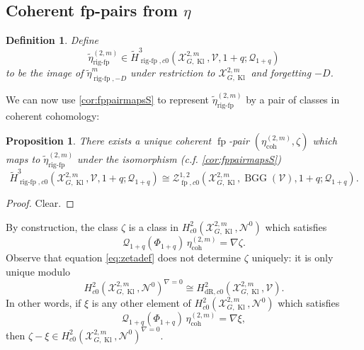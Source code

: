 \documentclass[cjm]{ipart}
\theoremstyle{plain}
\newtheorem{proposition}[theorem]{Proposition}
\newtheorem{definition}[theorem]{Definition}
\theoremstyle{remark}
\DeclareMathOperator{\BGG}{BGG}
\DeclareMathOperator{\coh}{coh}
\DeclareMathOperator{\fp}{fp}
\DeclareMathOperator{\Kl}{Kl}
\DeclareMathOperator{\rigfp}{rig-fp}
\newcommand{\Pif}{\Pi_{\mathrm{f}}}
\newcommand{\cN}{\mathcal{N}}
\newcommand{\cQ}{\mathcal{Q}}
\newcommand{\cV}{\mathcal{V}}
\newcommand{\cX}{\mathcal{X}}
\newcommand{\dR}{\mathrm{dR}}
\newcommand{\wH}{\widetilde{H}}
\numberwithin{equation}{subsection}
\begin{document}


 \subsection{Coherent fp-pairs from $\eta$}\label{ssec:coherentfppaireta}



  \begin{definition}\label{def:etaord}
   Define
  \[
   \tilde{\eta}_{\rigfp}^{(2,m)} \in \wH^3_{\rigfp, c0}(\cX_{G,\Kl}^{2,m}, \cV, 1+q; \cQ_{1+q})
  \]
  to be the image of $\tilde{\eta}_{\rigfp,-D}^{m} $ under restriction to $\cX_{G,\Kl}^{2,m}$ and forgetting $-D$.
  \end{definition}

  We can now use \cref{cor:fppairmapsS} to represent $\tilde{\eta}_{\rigfp}^{(2,m)}$ by a pair of classes in coherent cohomology:

 \begin{proposition}
  There exists a unique  coherent $\fp$-pair $\left(\eta_{\coh}^{(2,m)}, \zeta\right)$ which maps to $\tilde{\eta}_{\rigfp}^{(2,m)}$ under the isomorphism (c.f. \cref{cor:fppairmapsS})
     \[ \wH^3_{\rigfp, c0}(\cX_{G,\Kl}^{2,m}, \cV, 1+q;\cQ_{1+q}) \cong  \mathscr{Z}^{1,2}_{\fp, c0}(\cX_{G,\Kl}^{2,m},\BGG(\cV),1+q; \cQ_{1+q}).\]
 \end{proposition}
\begin{proof}
 Clear.
\end{proof}

  \begin{note}\label{note:lackofuniqueness}
   By construction, the class $\zeta$ is a class in $ H^2_{c0}(\cX_{G,\Kl}^{2,m}, \cN^0) $ which satisfies
    \begin{equation}
     \label{eq:zetadef}
     \cQ_{1+q}(\Phi_{1+q}) \, \eta^{(2,m)}_{\coh} = \nabla \zeta.
    \end{equation}
   Observe that equation \eqref{eq:zetadef} does not determine $\zeta$ uniquely: it is only unique modulo
   \[ H^2_{c0}(\cX_{G,\Kl}^{2,m}, \cN^0)^{\nabla = 0} \cong H^2_{\dR, c0}(\cX_{G,\Kl}^{2,m}, \cV).\]
   In other words, if $\xi$ is any other element of $H^2_{c0}(\cX_{G,\Kl}^{2,m}, \cN^0) $ which satisfies
   \[\cQ_{1+q}(\Phi_{1+q}) \, \eta^{(2,m)}_{\coh} = \nabla \xi,\]
   then $\zeta-\xi\in H^2_{c0}(\cX_{G,\Kl}^{2,m}, \cN^0)^{\nabla = 0}$.
  \end{note}
\end{document}
